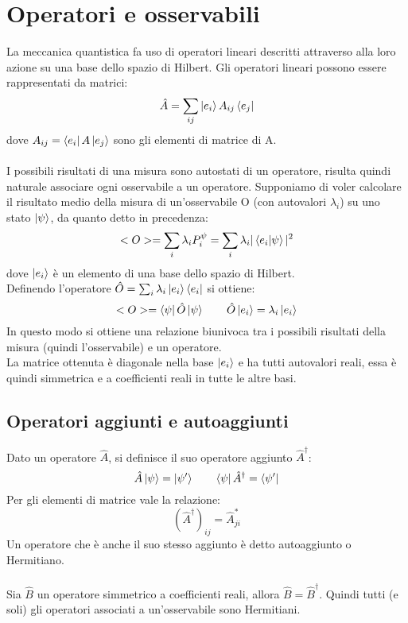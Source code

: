 \documentclass{article}
\begin{document}
\newpage

\section{Operatori e osservabili}
La meccanica quantistica fa uso di operatori lineari descritti attraverso alla loro azione su una base dello spazio di Hilbert. Gli operatori lineari possono essere rappresentati da matrici:
$$ \hat{A}=\sum_{ij}\ket{e_i}A_{ij}\bra{e_j}$$
dove $A_{ij}=\bra{e_i}A\ket{e_j}$ sono gli elementi di matrice di A.\\\\
I possibili risultati di una misura sono autostati di un operatore, risulta quindi naturale associare ogni osservabile a un operatore. Supponiamo di voler calcolare il risultato medio della misura di un'osservabile O (con autovalori $\lambda_i$) su uno stato $\ket{\psi}$, da quanto detto in precedenza:
$$ <O>=\sum_i \lambda_i P^{\psi}_i = \sum_i \lambda_i |\bra{e_i}\ket{\psi}|^2  $$
dove $\ket{e_i}$ è un elemento di una base dello spazio di Hilbert.\\
Definendo l'operatore $\hat{O}=\sum_i \lambda_i\ket{e_i}\bra{e_i}$ si ottiene:
$$ <O>=\bra{\psi}\hat{O}\ket{\psi} \qquad \hat{O}\ket{e_i}=\lambda_i\ket{e_i}$$
In questo modo si ottiene una relazione biunivoca tra i possibili risultati della misura (quindi l'osservabile) e un operatore.\\
La matrice ottenuta è diagonale nella base $\ket{e_i}$ e ha tutti autovalori reali, essa è quindi simmetrica e a coefficienti reali in tutte le altre basi.

\subsection{Operatori aggiunti e autoaggiunti}
Dato un operatore $\hat{A}$, si definisce il suo operatore aggiunto $\hat{A}^\dagger$:
$$ \hat{A}\ket{\psi}=\ket{\psi'} \qquad \bra{\psi}\hat{A}^\dagger=\bra{\psi'} $$
Per gli elementi di matrice vale la relazione:
$$ \left(\hat{A}^\dagger\right)_{ij} = \hat{A}_{ji}^*$$
Un operatore che è anche il suo stesso aggiunto è detto autoaggiunto o Hermitiano.\\\\
Sia $\hat{B}$ un operatore simmetrico a coefficienti reali, allora $\hat{B}=\hat{B}^\dagger$. Quindi tutti (e soli) gli operatori associati a un'osservabile sono Hermitiani.
\end{document}
